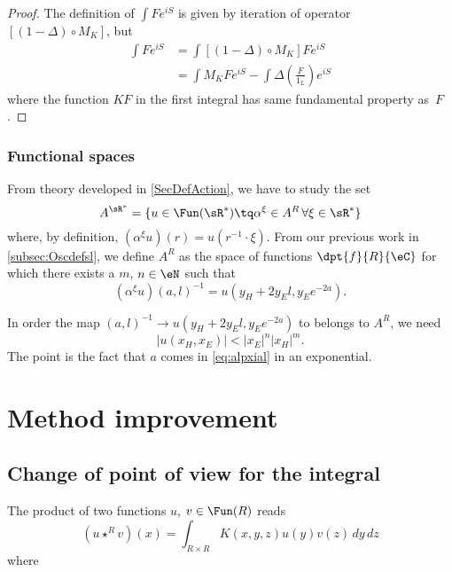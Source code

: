 \begin{proof}
The definition of $\int F e^{iS}$ is given by iteration of operator $[(1-\Delta)\circ M_K]$, but
\begin{equation}
\begin{split}
\int F e^{iS}&=\int [(1-\Delta)\circ M_K]F e^{iS}\\
		&=\int M_KF e^{iS}-\int \Delta\left( \frac{F}{1_L} \right) e^{iS}
\end{split}
\end{equation}
where the function $KF$ in the first integral has same fundamental property as~$F$.
\end{proof}

\subsubsection{Functional spaces}

From theory developed in \ref{SecDefAction}, we have to study the set
\[ 
  A^{\sR^*}=\{ u\in\Fun(\sR^*)\tq \alpha^{\xi}\in A^R\,\forall \xi\in\sR^* \}
\]
where, by definition, $(\alpha^{\xi}u)(r)=u(r^{-1}\cdot\xi)$. From our previous work in \ref{subsec:Oscdefsl}, we define $A^R$ as the space of functions $\dpt{f}{R}{\eC}$ for which there exists a $m$, $n\in\eN$ such that
\begin{equation}  \label{eq:alpxial}
  (\alpha^{\xi}u)(a,l)^{-1}=u(y_H+2y_El,y_Ee^{-2a}).
\end{equation}

In order the map $(a,l)^{-1}\to u(y_H+2y_El,y_Ee^{-2a})$ to belongs to $A^R$, we need
\begin{equation}
   | u(x_H,x_E) |< | x_E |^n| x_H |^m.
\end{equation}
The point is the fact that $a$ comes in \eqref{eq:alpxial} in an exponential. 

\section{Method improvement}

\subsection{Change of point of view for the integral}


The product of two functions $u$, $v\in\Fun(R)$ reads
\begin{equation}
(u\star^R v)(x)=\int_{R\times R} K(x,y,z)u(y)v(z)\,dy\,dz
\end{equation}
where

